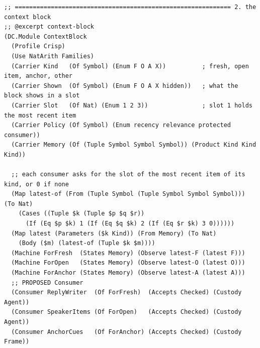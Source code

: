 \documentclass[11pt]{article}
\theoremstyle{definition}
\theoremstyle{plain}
\begin{document}
\begin{lstlisting}[style=mettafull]
;; ============================================================ 2. the context block
;; @excerpt context-block
(DC.Module ContextBlock
  (Profile Crisp)
  (Use NatArith Families)
  (Carrier Kind   (Of Symbol) (Enum F O A X))          ; fresh, open item, anchor, other
  (Carrier Shown  (Of Symbol) (Enum F O A X hidden))   ; what the block shows in a slot
  (Carrier Slot   (Of Nat) (Enum 1 2 3))               ; slot 1 holds the most recent item
  (Carrier Policy (Of Symbol) (Enum recency relevance protected consumer))
  (Carrier Memory (Of (Tuple Symbol Symbol Symbol)) (Product Kind Kind Kind))

  ;; each consumer asks for the slot of the most recent item of its kind, or 0 if none
  (Map latest-of (From (Tuple Symbol (Tuple Symbol Symbol Symbol))) (To Nat)
    (Cases ((Tuple $k (Tuple $p $q $r))
      (If (Eq $p $k) 1 (If (Eq $q $k) 2 (If (Eq $r $k) 3 0))))))
  (Map latest (Parameters ($k Kind)) (From Memory) (To Nat)
    (Body ($m) (latest-of (Tuple $k $m))))
  (Machine ForFresh  (States Memory) (Observe latest-F (latest F)))
  (Machine ForOpen   (States Memory) (Observe latest-O (latest O)))
  (Machine ForAnchor (States Memory) (Observe latest-A (latest A)))
  ;; PROPOSED Consumer
  (Consumer ReplyWriter  (Of ForFresh)  (Accepts Checked) (Custody Agent))
  (Consumer SpeakerItems (Of ForOpen)   (Accepts Checked) (Custody Agent))
  (Consumer AnchorCues   (Of ForAnchor) (Accepts Checked) (Custody Frame))


\end{lstlisting}
\end{document}
